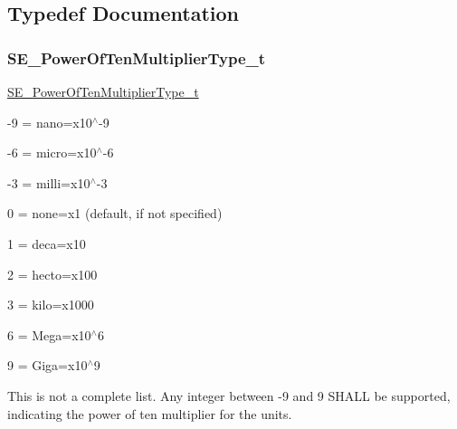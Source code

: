 \subsection{Typedef Documentation}
\mbox{\label{group__PowerOfTenMultiplierType_gaf0317b781dc8dbb9cb6ac4e44a14fdef}} 
\subsubsection{\texorpdfstring{S\+E\+\_\+\+Power\+Of\+Ten\+Multiplier\+Type\+\_\+t}{SE\_PowerOfTenMultiplierType\_t}}
{\footnotesize\ttfamily \hyperlink{group__PowerOfTenMultiplierType_gaf0317b781dc8dbb9cb6ac4e44a14fdef}{S\+E\+\_\+\+Power\+Of\+Ten\+Multiplier\+Type\+\_\+t}}

-\/9 = nano=x10$^\wedge$-\/9

-\/6 = micro=x10$^\wedge$-\/6

-\/3 = milli=x10$^\wedge$-\/3

0 = none=x1 (default, if not specified)

1 = deca=x10

2 = hecto=x100

3 = kilo=x1000

6 = Mega=x10$^\wedge$6

9 = Giga=x10$^\wedge$9

This is not a complete list. Any integer between -\/9 and 9 S\+H\+A\+LL be supported, indicating the power of ten multiplier for the units. 